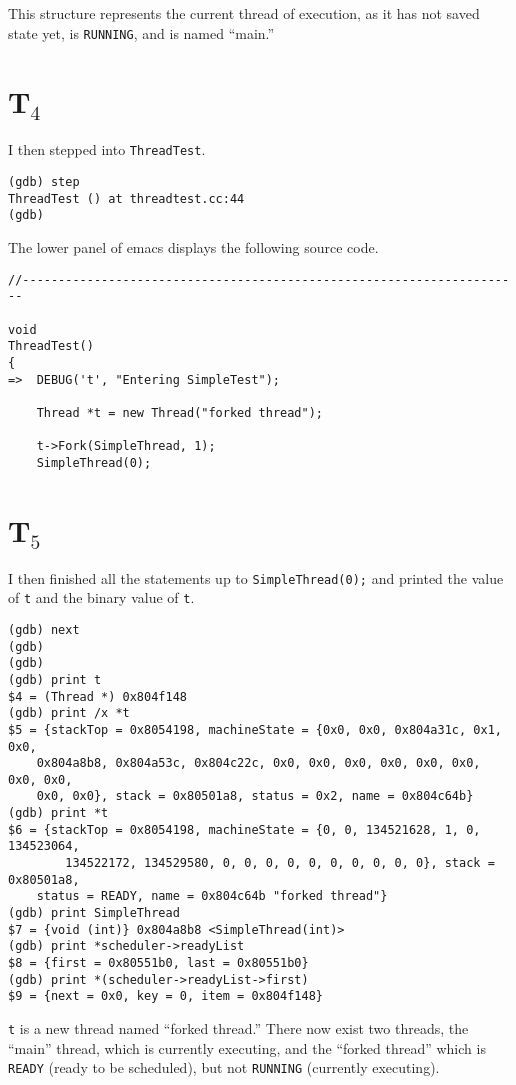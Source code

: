 \documentclass[letterpaper, 10pt]{article}
\begin{document}
	This structure represents the current thread of execution, as it has not saved state yet, is {\tt RUNNING}, and is named ``main.''

	\section*{T$_4$}

	I then stepped into {\tt ThreadTest}.

	\begin{verbatim}
(gdb) step
ThreadTest () at threadtest.cc:44
(gdb)
	\end{verbatim}

	The lower panel of emacs displays the following source code.

	\begin{verbatim}
//----------------------------------------------------------------------

void
ThreadTest()
{
=>  DEBUG('t', "Entering SimpleTest");

    Thread *t = new Thread("forked thread");

    t->Fork(SimpleThread, 1);
    SimpleThread(0);
	\end{verbatim}

	\section*{T$_5$}

	I then finished all the statements up to {\tt SimpleThread(0);} and printed the value of {\tt t} and the binary value of {\tt *t}.

	\begin{verbatim}
(gdb) next
(gdb)
(gdb)
(gdb) print t
$4 = (Thread *) 0x804f148
(gdb) print /x *t
$5 = {stackTop = 0x8054198, machineState = {0x0, 0x0, 0x804a31c, 0x1, 0x0,
	0x804a8b8, 0x804a53c, 0x804c22c, 0x0, 0x0, 0x0, 0x0, 0x0, 0x0, 0x0, 0x0,
	0x0, 0x0}, stack = 0x80501a8, status = 0x2, name = 0x804c64b}
(gdb) print *t
$6 = {stackTop = 0x8054198, machineState = {0, 0, 134521628, 1, 0, 134523064,
		134522172, 134529580, 0, 0, 0, 0, 0, 0, 0, 0, 0, 0}, stack = 0x80501a8,
	status = READY, name = 0x804c64b "forked thread"}
(gdb) print SimpleThread
$7 = {void (int)} 0x804a8b8 <SimpleThread(int)>
(gdb) print *scheduler->readyList
$8 = {first = 0x80551b0, last = 0x80551b0}
(gdb) print *(scheduler->readyList->first)
$9 = {next = 0x0, key = 0, item = 0x804f148}
	\end{verbatim}

	{\tt t} is a new thread named ``forked thread.'' There now exist two threads, the ``main'' thread, which is currently executing, and the ``forked thread'' which is {\tt READY} (ready to be scheduled), but not {\tt RUNNING} (currently executing).
\end{document}
